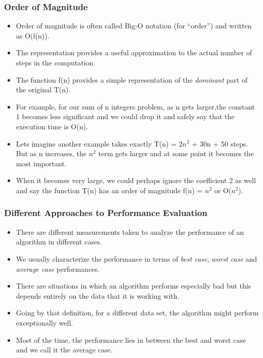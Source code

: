 \documentclass{beamer}
\begin{document}
\begin{frame}
\frametitle{Order of Magnitude}
\begin{itemize}
\item Order of magnitude is often called Big-O notation (for “order”) and written as
O(f(n)).
\item The representation provides a useful approximation to the actual number of steps in the computation.
\item The function f(n) provides a simple representation of the \textit{dominant} part of the original T(n).
\item For example, for our sum of n integers problem, as n gets larger,the constant 1 becomes less significant and we could drop it and safely say that the execution time is O(n).
\item Lets imagine another example takes exactly T(n) = 2$n^2$ + 30n + 50 steps. But as n increases, the $n^2$ term gets larger and at some point it becomes the most important.
\item When it becomes very large, we could perhaps ignore the coefficient 2 as well and say the function T(n) has an order of magnitude f(n) = $n^2$ or O($n^2$). 
\end{itemize}
\end{frame}

\begin{frame}
\frametitle{Different Approaches to Performance Evaluation}
\begin{itemize}
\item There are different measurements taken to analyze the performance of an algorithm in different cases.
\item We usually characterize the performance in terms of \textit{best case}, \textit{worst case} and \textit{average case} performances.
\item There are situations in which an algorithm performs especially bad but this depends entirely on the data that it is working with.
\item Going by that definition, for a different data set, the algorithm might perform exceptionally well.
\item Most of the time, the performance lies in between the best and worst case and we call it the average case.
\end{itemize}
\end{frame}

\end{document}
